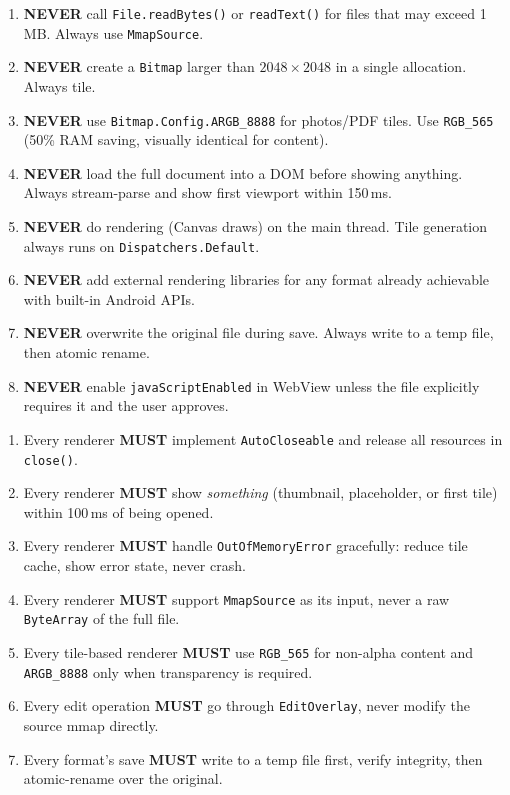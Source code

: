 \documentclass[12pt,a4paper]{report}
\begin{document}
\begin{cbox}
\begin{enumerate}[leftmargin=1.4em,topsep=2pt,itemsep=4pt]
  \item \textbf{NEVER} call \texttt{File.readBytes()} or \texttt{readText()} for
    files that may exceed 1\,MB. Always use \texttt{MmapSource}.
  \item \textbf{NEVER} create a \texttt{Bitmap} larger than $2048 \times 2048$
    in a single allocation. Always tile.
  \item \textbf{NEVER} use \texttt{Bitmap.Config.ARGB\_8888} for photos/PDF
    tiles. Use \texttt{RGB\_565} (50\% RAM saving, visually identical for content).
  \item \textbf{NEVER} load the full document into a DOM before showing anything.
    Always stream-parse and show first viewport within 150\,ms.
  \item \textbf{NEVER} do rendering (Canvas draws) on the main thread. Tile
    generation always runs on \texttt{Dispatchers.Default}.
  \item \textbf{NEVER} add external rendering libraries for any format already
    achievable with built-in Android APIs.
  \item \textbf{NEVER} overwrite the original file during save. Always write to
    a temp file, then atomic rename.
  \item \textbf{NEVER} enable \texttt{javaScriptEnabled} in WebView unless the
    file explicitly requires it and the user approves.
\end{enumerate}
\end{cbox}

\begin{gbox}
\begin{enumerate}[leftmargin=1.4em,topsep=2pt,itemsep=4pt]
  \item Every renderer \textbf{MUST} implement \texttt{AutoCloseable} and
    release all resources in \texttt{close()}.
  \item Every renderer \textbf{MUST} show \emph{something} (thumbnail, placeholder,
    or first tile) within 100\,ms of being opened.
  \item Every renderer \textbf{MUST} handle \texttt{OutOfMemoryError} gracefully:
    reduce tile cache, show error state, never crash.
  \item Every renderer \textbf{MUST} support \texttt{MmapSource} as its input,
    never a raw \texttt{ByteArray} of the full file.
  \item Every tile-based renderer \textbf{MUST} use \texttt{RGB\_565} for
    non-alpha content and \texttt{ARGB\_8888} only when transparency is required.
  \item Every edit operation \textbf{MUST} go through \texttt{EditOverlay},
    never modify the source mmap directly.
  \item Every format's save \textbf{MUST} write to a temp file first, verify
    integrity, then atomic-rename over the original.
\end{enumerate}
\end{gbox}
\end{document}

